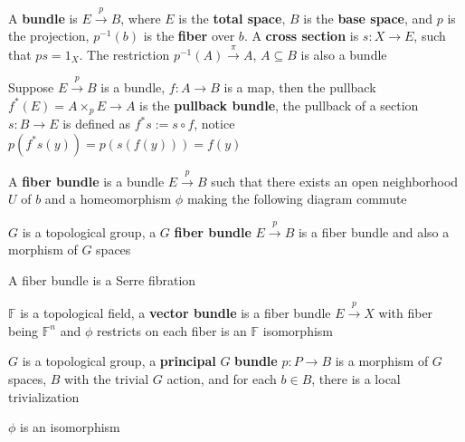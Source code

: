 \documentclass[main]{subfiles}
\begin{document}
\begin{definition}
A \textbf{bundle} is $E\overset{p}{\to}B$, where $E$ is the \textbf{total space}, $B$ is the \textbf{base space}, and $p$ is the projection, $p^{-1}(b)$ is the \textbf{fiber} over $b$. A \textbf{cross section} is $s: X\rightarrow E$, such that $ps=1_X$. The restriction $p^{-1}(A)\overset{\pi}{\to}A$, $A\subseteq B$ is also a bundle
\end{definition}

\begin{definition}
Suppose $E\overset{p}{\to}B$ is a bundle, $f:A\to B$ is a map, then the pullback $f^*(E)=A\times_pE\to A$ is the \textbf{pullback bundle}, the pullback of a section $s: B\to E$ is defined as $f^*s:=s\circ f$, notice $p(f^*s(y))=p(s(f(y)))=f(y)$
\end{definition}

\begin{definition}
A \textbf{fiber bundle} is a bundle $E\overset{p}{\to}B$ such that there exists an open neighborhood $U$ of $b$ and a homeomorphism $\phi$ making the following diagram commute
\begin{center}
\end{center}
\end{definition}

\begin{definition}
$G$ is a topological group, a $G$ \textbf{fiber bundle} $E\xrightarrow{p}B$ is a fiber bundle and also a morphism of $G$ spaces
\end{definition}

\begin{lemma}
A fiber bundle is a Serre fibration
\end{lemma}

\begin{definition}
$\mathbb F$ is a topological field, a \textbf{vector bundle} is a fiber bundle $E\overset{p}{\rightarrow}X$ with fiber being $\mathbb F^n$ and $\phi$ restricts on each fiber is an $\mathbb F$ isomorphism
\end{definition}

\begin{definition}
$G$ is a topological group, a \textbf{principal} $G$ \textbf{bundle} $p:P\to B$ is a morphism of $G$ spaces, $B$ with the trivial $G$ action, and for each $b\in B$, there is a local trivialization
\begin{center}
\end{center}
$\phi$ is an isomorphism
\end{definition}
\end{document}
